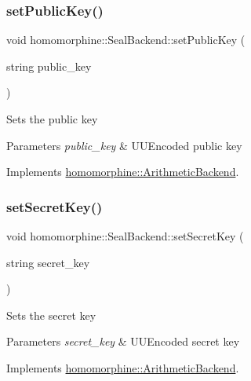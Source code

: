 \subsubsection{\texorpdfstring{set\+Public\+Key()}{setPublicKey()}}
{\footnotesize\ttfamily void homomorphine\+::\+Seal\+Backend\+::set\+Public\+Key (\begin{DoxyParamCaption}\item[{string}]{public\+\_\+key }\end{DoxyParamCaption})\hspace{0.3cm}{\ttfamily [virtual]}}

Sets the public key


\begin{DoxyParams}{Parameters}
{\em public\+\_\+key} & U\+U\+Encoded public key \\
\hline
\end{DoxyParams}


Implements \hyperlink{classhomomorphine_1_1_arithmetic_backend_af2dd2c37ed1fcd56b58baa6cb3f14e8b}{homomorphine\+::\+Arithmetic\+Backend}.

\mbox{\label{classhomomorphine_1_1_seal_backend_aa9fd3331b2c710e8fdfc3385bbf11eb5}} 
\subsubsection{\texorpdfstring{set\+Secret\+Key()}{setSecretKey()}}
{\footnotesize\ttfamily void homomorphine\+::\+Seal\+Backend\+::set\+Secret\+Key (\begin{DoxyParamCaption}\item[{string}]{secret\+\_\+key }\end{DoxyParamCaption})\hspace{0.3cm}{\ttfamily [virtual]}}

Sets the secret key


\begin{DoxyParams}{Parameters}
{\em secret\+\_\+key} & U\+U\+Encoded secret key \\
\hline
\end{DoxyParams}


Implements \hyperlink{classhomomorphine_1_1_arithmetic_backend_a0bb3c2728df4662c6472d4d43215410f}{homomorphine\+::\+Arithmetic\+Backend}.


